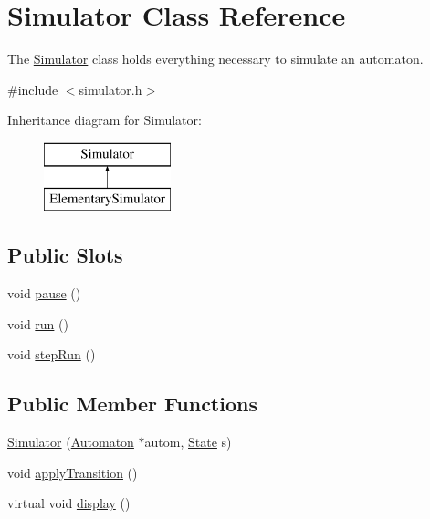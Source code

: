 \hypertarget{class_simulator}{}\section{Simulator Class Reference}
\label{class_simulator}


The \mbox{\hyperlink{class_simulator}{Simulator}} class holds everything necessary to simulate an automaton.  




{\ttfamily \#include $<$simulator.\+h$>$}

Inheritance diagram for Simulator\+:\begin{figure}[H]
\begin{center}
\leavevmode
\includegraphics[height=2.000000cm]{class_simulator}
\end{center}
\end{figure}
\subsection*{Public Slots}
\begin{DoxyCompactItemize}
\item 
void \mbox{\hyperlink{class_simulator_ae98491fdcf683de0035e01d26cdbd00e}{pause}} ()
\item 
void \mbox{\hyperlink{class_simulator_aa2de7e32b04cc3e8fc60aec23997621b}{run}} ()
\item 
void \mbox{\hyperlink{class_simulator_ad84a8ccf003a5c62a47d4e9cbcc11f32}{step\+Run}} ()
\end{DoxyCompactItemize}
\subsection*{Public Member Functions}
\begin{DoxyCompactItemize}
\item 
\mbox{\hyperlink{class_simulator_a367e387c2c34fba34e14dbe1024bc567}{Simulator}} (\mbox{\hyperlink{class_automaton}{Automaton}} $\ast$autom, \mbox{\hyperlink{class_state}{State}} s)
\item 
void \mbox{\hyperlink{class_simulator_a0f40dc39043239da2a50e71e2995e689}{apply\+Transition}} ()
\item 
virtual void \mbox{\hyperlink{class_simulator_ae67f79cd49d6636f57761eec3b2656b5}{display}} ()
\end{DoxyCompactItemize}


